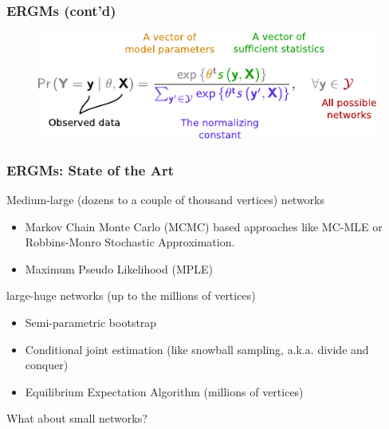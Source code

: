 \documentclass[aspectratio=169, 9pt, handout]{beamer}\usepackage[]{graphicx}\usepackage[]{color}
\begin{document}
\begin{frame}[label=ergmeq]
\frametitle{ERGMs (cont'd)}
\begin{figure}
\centering
\includegraphics[width=.7\linewidth]{parts-of-ergm.pdf}
\end{figure}


\vfill\hfill \hyperlink{ergmterms}{}
\end{frame}


\begin{frame}[label=art]
\frametitle{ERGMs: State of the Art}
\pause
Medium-large (dozens to a couple of thousand vertices) networks

\begin{itemize}
\item Markov Chain Monte Carlo (MCMC) based approaches like MC-MLE or Robbins-Monro Stochastic Approximation. \hyperlink{mcmle}{}
\item Maximum Pseudo Likelihood (MPLE)
\end{itemize}\pause

large-huge networks (up to the millions of vertices)

\begin{itemize}
\item Semi-parametric bootstrap
\item Conditional joint estimation (like snowball sampling, a.k.a. divide and conquer)
\item Equilibrium Expectation Algorithm (millions of vertices)
\end{itemize}\pause

What about small networks?

\end{frame}

% 
\end{document}
